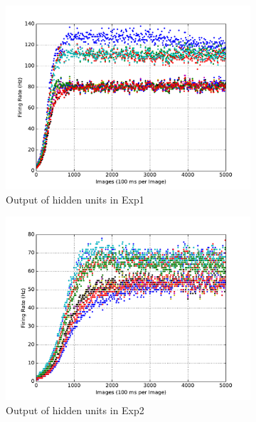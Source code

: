 \begin{figure}
\begin{subfigure}[t]{0.4\textwidth}
		\includegraphics[width=\textwidth]{pics_sdlm/00_exp_SAE_Orig/exp1_hid_s.pdf}
		\caption{Output of hidden units in Exp1}
	\end{subfigure}
	\begin{subfigure}[t]{0.4\textwidth}
		\includegraphics[width=\textwidth]{pics_sdlm/00_exp_SAE_Orig/exp2_hid_s.pdf}
		\caption{Output of hidden units in Exp2}
	\end{subfigure}\\
	\begin{subfigure}[t]{0.4\textwidth}

\end{subfigure}
\end{figure}
